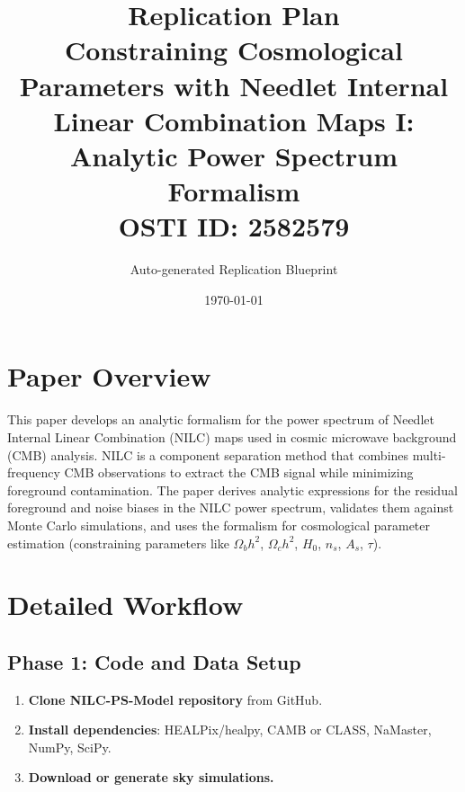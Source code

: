 \documentclass[11pt,a4paper]{article}
\title{\textbf{Replication Plan}\\[0.5em]
\large Constraining Cosmological Parameters with Needlet Internal Linear Combination Maps I: Analytic Power Spectrum Formalism\\[0.3em]
\normalsize OSTI ID: 2582579}
\author{Auto-generated Replication Blueprint}
\date{\today}
\begin{document}
\maketitle
\tableofcontents
\newpage

\section{Paper Overview}
This paper develops an analytic formalism for the power spectrum of Needlet Internal Linear Combination (NILC) maps used in cosmic microwave background (CMB) analysis. NILC is a component separation method that combines multi-frequency CMB observations to extract the CMB signal while minimizing foreground contamination. The paper derives analytic expressions for the residual foreground and noise biases in the NILC power spectrum, validates them against Monte Carlo simulations, and uses the formalism for cosmological parameter estimation (constraining parameters like $\Omega_b h^2$, $\Omega_c h^2$, $H_0$, $n_s$, $A_s$, $\tau$).

\section{Detailed Workflow}

\subsection{Phase 1: Code and Data Setup}
\begin{enumerate}[label=\textbf{1.\arabic*}]
  \item \textbf{Clone NILC-PS-Model repository} from GitHub.
  \item \textbf{Install dependencies}: HEALPix/healpy, CAMB or CLASS, NaMaster, NumPy, SciPy.
  \item \textbf{Download or generate sky simulations.}
\end{enumerate}
\end{document}
